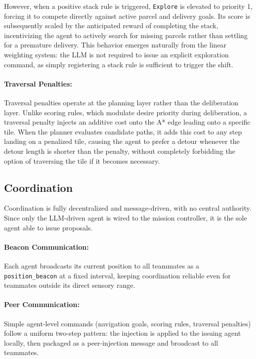However, when a positive stack rule is triggered, \texttt{Explore} is elevated to priority 1, forcing it to compete directly against active parcel and delivery goals.
Its score is subsequently scaled by the anticipated reward of completing the stack, incentivizing the agent to actively search for missing parcels rather than settling for a premature delivery.
This behavior emerges naturally from the linear weighting system: the LLM is not required to issue an explicit exploration command, as simply registering a stack rule is sufficient to trigger the shift.

\paragraph{Traversal Penalties:}
Traversal penalties operate at the planning layer rather than the deliberation layer.
Unlike scoring rules, which modulate desire priority during deliberation, a traversal penalty injects an additive cost onto the A* edge leading onto a specific tile.
When the planner evaluates candidate paths, it adds this cost to any step landing on a penalized tile, causing the agent to prefer a detour whenever the detour length is shorter than the penalty,
without completely forbidding the option of traversing the tile if it becomes necessary.

\subsection{Coordination}
\label{sec:coordination}

Coordination is fully decentralized and message-driven, with no central authority.
Since only the LLM-driven agent is wired to the mission controller, it is the sole agent able to issue proposals.

\paragraph{Beacon Communication:}
Each agent broadcasts its current position to all teammates as a \texttt{position\_beacon} at a fixed interval, keeping coordination reliable even for teammates outside its direct sensory range.

\paragraph{Peer Communication:}
Simple agent-level commands (navigation goals, scoring rules, traversal penalties) follow a uniform two-step pattern: 
the injection is applied to the issuing agent locally, then packaged as a peer-injection message and broadcast to all teammates.

